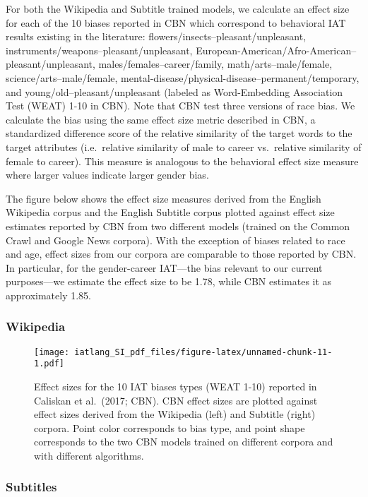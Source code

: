 \documentclass[]{article}
\begin{document}
For both the Wikipedia and Subtitle trained models, we calculate an
effect size for each of the 10 biases reported in CBN which correspond
to behavioral IAT results existing in the literature:
flowers/insects--pleasant/unpleasant,
instruments/weapons--pleasant/unpleasant,
European-American/Afro-American--pleasant/unpleasant,
males/females--career/family, math/arts--male/female,
science/arts--male/female,
mental-disease/physical-disease--permanent/temporary, and
young/old--pleasant/unpleasant (labeled as Word-Embedding Association
Test (WEAT) 1-10 in CBN). Note that CBN test three versions of race
bias. We calculate the bias using the same effect size metric described
in CBN, a standardized difference score of the relative similarity of
the target words to the target attributes (i.e.~relative similarity of
male to career vs.~relative similarity of female to career). This
measure is analogous to the behavioral effect size measure where larger
values indicate larger gender bias.

The figure below shows the effect size measures derived from the English
Wikipedia corpus and the English Subtitle corpus plotted against effect
size estimates reported by CBN from two different models (trained on the
Common Crawl and Google News corpora). With the exception of biases
related to race and age, effect sizes from our corpora are comparable to
those reported by CBN. In particular, for the gender-career IAT---the
bias relevant to our current purposes---we estimate the effect size to
be 1.78, while CBN estimates it as approximately 1.85.

\hypertarget{wikipedia}{%
\subsubsection{Wikipedia}\label{wikipedia}}

\begin{figure}
\centering
\texttt{[image: iatlang\_SI\_pdf\_files/figure-latex/unnamed-chunk-11-1.pdf]}
\caption{Effect sizes for the 10 IAT biases types (WEAT 1-10) reported
in Caliskan et al.~(2017; CBN). CBN effect sizes are plotted against
effect sizes derived from the Wikipedia (left) and Subtitle (right)
corpora. Point color corresponds to bias type, and point shape
corresponds to the two CBN models trained on different corpora and with
different algorithms.}
\end{figure}

\hypertarget{subtitles}{%
\subsubsection{Subtitles}\label{subtitles}}
\end{document}
